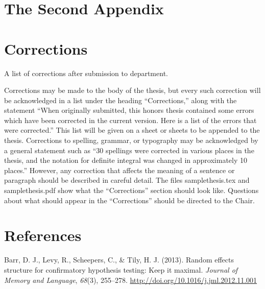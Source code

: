 \documentclass[12pt, twoside]{amherstthesis}
\begin{document}
\hypertarget{the-second-appendix}{%
\chapter{The Second Appendix}\label{the-second-appendix}}

\hypertarget{corrections}{%
\chapter*{Corrections}\label{corrections}}

A list of corrections after submission to department.

Corrections may be made to the body of the thesis, but every such correction will be acknowledged in a list under the heading ``Corrections,'' along with the statement ``When originally submitted, this honors thesis contained some errors which have been corrected in the current version. Here is a list of the errors that were corrected.'' This list will be given on a sheet or sheets to be appended to the thesis. Corrections to spelling, grammar, or typography may be acknowledged by a general statement such as ``30 spellings were corrected in various places in the thesis, and the notation for definite integral was changed in approximately 10 places.'' However, any correction that affects the meaning of a sentence or paragraph should be described in careful detail. The files samplethesis.tex and samplethesis.pdf show what the ``Corrections'' section should look like. Questions about what should appear in the ``Corrections'' should be directed to the Chair.

\backmatter

\hypertarget{references}{%
\chapter*{References}\label{references}}

\noindent

\setlength{\parindent}{-0.20in}
\setlength{\leftskip}{0.20in}
\setlength{\parskip}{8pt}

\hypertarget{refs}{}
\leavevmode\hypertarget{ref-barr_random_2013}{}%
Barr, D. J., Levy, R., Scheepers, C., \& Tily, H. J. (2013). Random effects structure for confirmatory hypothesis testing: Keep it maximal. \emph{Journal of Memory and Language}, \emph{68}(3), 255--278. \url{http://doi.org/10.1016/j.jml.2012.11.001}
\end{document}
